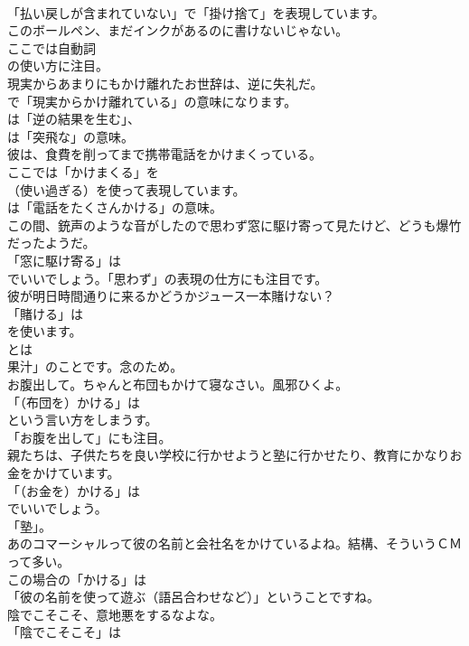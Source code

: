 \documentclass[8pt]{extreport}
\begin{document}
\begin{CJK}{UTF8}{min}
\\	「払い戻しが含まれていない」で「掛け捨て」を表現しています。	
\\	このボールペン、まだインクがあるのに書けないじゃない。 
\\	ここでは自動詞
\\	の使い方に注目。	
\\	現実からあまりにもかけ離れたお世辞は、逆に失礼だ。 
\\	で「現実からかけ離れている」の意味になります。
\\	は「逆の結果を生む」、
\\	は「突飛な」の意味。	
\\	彼は、食費を削ってまで携帯電話をかけまくっている。 
\\	ここでは「かけまくる」を
\\	（使い過ぎる）を使って表現しています。
\\	は「電話をたくさんかける」の意味。	
\\	この間、銃声のような音がしたので思わず窓に駆け寄って見たけど、どうも爆竹だったようだ。 
\\	「窓に駆け寄る」は 
\\	でいいでしょう。「思わず」の表現の仕方にも注目です。	
\\	彼が明日時間通りに来るかどうかジュース一本賭けない？ 
\\	「賭ける」は
\\	を使います。
\\	とは
\\	果汁」のことです。念のため。	
\\	お腹出して。ちゃんと布団もかけて寝なさい。風邪ひくよ。 
\\	「（布団を）かける」は
\\	という言い方をしまうす。
\\	「お腹を出して」にも注目。	
\\	親たちは、子供たちを良い学校に行かせようと塾に行かせたり、教育にかなりお金をかけています。 
\\	「（お金を）かける」は
\\	でいいでしょう。
\\	「塾」。	
\\	あのコマーシャルって彼の名前と会社名をかけているよね。結構、そういうＣＭって多い。 
\\	この場合の「かける」は
\\	「彼の名前を使って遊ぶ（語呂合わせなど）」ということですね。	
\\	陰でこそこそ、意地悪をするなよな。 
\\	「陰でこそこそ」は

\end{CJK}
\end{document}
